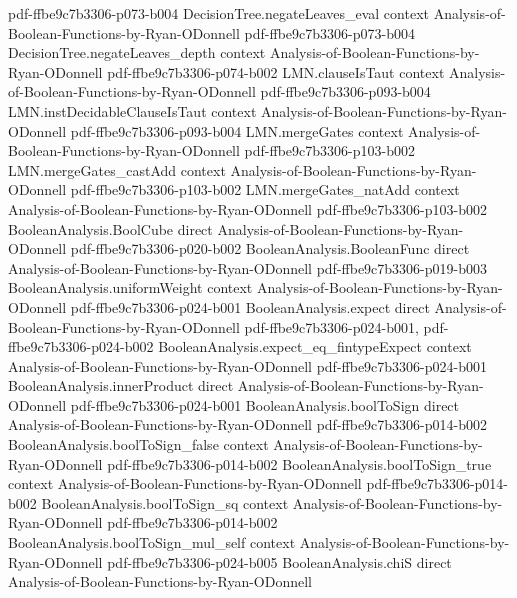 \begin{lemma}
  {pdf-ffbe9c7b3306-p073-b004}
\proofstep
  {DecisionTree.negateLeaves_eval}
  {context}
  {Analysis-of-Boolean-Functions-by-Ryan-ODonnell}
  {pdf-ffbe9c7b3306-p073-b004}
\proofstep
  {DecisionTree.negateLeaves_depth}
  {context}
  {Analysis-of-Boolean-Functions-by-Ryan-ODonnell}
  {pdf-ffbe9c7b3306-p074-b002}
\proofstep
  {LMN.clauseIsTaut}
  {context}
  {Analysis-of-Boolean-Functions-by-Ryan-ODonnell}
  {pdf-ffbe9c7b3306-p093-b004}
\proofstep
  {LMN.instDecidableClauseIsTaut}
  {context}
  {Analysis-of-Boolean-Functions-by-Ryan-ODonnell}
  {pdf-ffbe9c7b3306-p093-b004}
\proofstep
  {LMN.mergeGates}
  {context}
  {Analysis-of-Boolean-Functions-by-Ryan-ODonnell}
  {pdf-ffbe9c7b3306-p103-b002}
\proofstep
  {LMN.mergeGates_castAdd}
  {context}
  {Analysis-of-Boolean-Functions-by-Ryan-ODonnell}
  {pdf-ffbe9c7b3306-p103-b002}
\proofstep
  {LMN.mergeGates_natAdd}
  {context}
  {Analysis-of-Boolean-Functions-by-Ryan-ODonnell}
  {pdf-ffbe9c7b3306-p103-b002}
\proofstep
  {BooleanAnalysis.BoolCube}
  {direct}
  {Analysis-of-Boolean-Functions-by-Ryan-ODonnell}
  {pdf-ffbe9c7b3306-p020-b002}
\proofstep
  {BooleanAnalysis.BooleanFunc}
  {direct}
  {Analysis-of-Boolean-Functions-by-Ryan-ODonnell}
  {pdf-ffbe9c7b3306-p019-b003}
\proofstep
  {BooleanAnalysis.uniformWeight}
  {context}
  {Analysis-of-Boolean-Functions-by-Ryan-ODonnell}
  {pdf-ffbe9c7b3306-p024-b001}
\proofstep
  {BooleanAnalysis.expect}
  {direct}
  {Analysis-of-Boolean-Functions-by-Ryan-ODonnell}
  {pdf-ffbe9c7b3306-p024-b001,
    pdf-ffbe9c7b3306-p024-b002}
\proofstep
  {BooleanAnalysis.expect_eq_fintypeExpect}
  {context}
  {Analysis-of-Boolean-Functions-by-Ryan-ODonnell}
  {pdf-ffbe9c7b3306-p024-b001}
\proofstep
  {BooleanAnalysis.innerProduct}
  {direct}
  {Analysis-of-Boolean-Functions-by-Ryan-ODonnell}
  {pdf-ffbe9c7b3306-p024-b001}
\proofstep
  {BooleanAnalysis.boolToSign}
  {direct}
  {Analysis-of-Boolean-Functions-by-Ryan-ODonnell}
  {pdf-ffbe9c7b3306-p014-b002}
\proofstep
  {BooleanAnalysis.boolToSign_false}
  {context}
  {Analysis-of-Boolean-Functions-by-Ryan-ODonnell}
  {pdf-ffbe9c7b3306-p014-b002}
\proofstep
  {BooleanAnalysis.boolToSign_true}
  {context}
  {Analysis-of-Boolean-Functions-by-Ryan-ODonnell}
  {pdf-ffbe9c7b3306-p014-b002}
\proofstep
  {BooleanAnalysis.boolToSign_sq}
  {context}
  {Analysis-of-Boolean-Functions-by-Ryan-ODonnell}
  {pdf-ffbe9c7b3306-p014-b002}
\proofstep
  {BooleanAnalysis.boolToSign_mul_self}
  {context}
  {Analysis-of-Boolean-Functions-by-Ryan-ODonnell}
  {pdf-ffbe9c7b3306-p024-b005}
\proofstep
  {BooleanAnalysis.chiS}
  {direct}
  {Analysis-of-Boolean-Functions-by-Ryan-ODonnell}

\end{lemma}
